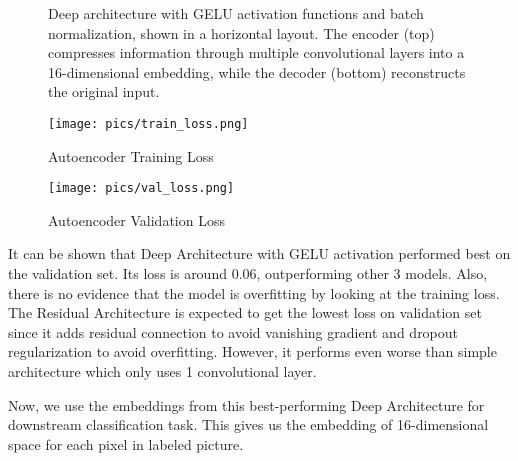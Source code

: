 \documentclass[10pt,letterpaper]{article}
\begin{document}
\begin{figure}[h]
\caption{Deep architecture with GELU activation functions and batch normalization, shown in a horizontal layout. The encoder (top) compresses information through multiple convolutional layers into a 16-dimensional embedding, while the decoder (bottom) reconstructs the original input.}
\label{fig:deep}
\end{figure}



\begin{figure}[htbp]
    \centering
    \begin{minipage}{0.48\textwidth}
    \texttt{[image: pics/train\_loss.png]}  
    \caption{Autoencoder Training Loss}
    \label{fig:trainloss}
    \end{minipage}
    \hfill
    \begin{minipage}{0.48\textwidth}
    \texttt{[image: pics/val\_loss.png]}  
    \caption{Autoencoder Validation Loss}
    \label{fig:valloss}
    \end{minipage}
\end{figure}


It can be shown that Deep Architecture with GELU activation performed best on the validation set. Its loss is around 0.06, outperforming other 3 models. Also, there is no evidence that the model is overfitting by looking at the training loss. The Residual Architecture is expected to get the lowest loss on validation set since it adds residual connection to avoid vanishing gradient and dropout regularization to avoid overfitting. However, it performs even worse than simple architecture which only uses 1 convolutional layer. 

Now, we use the embeddings from this best-performing Deep Architecture for downstream classification task. This gives us the embedding of 16-dimensional space for each pixel in labeled picture. 
\end{document}
